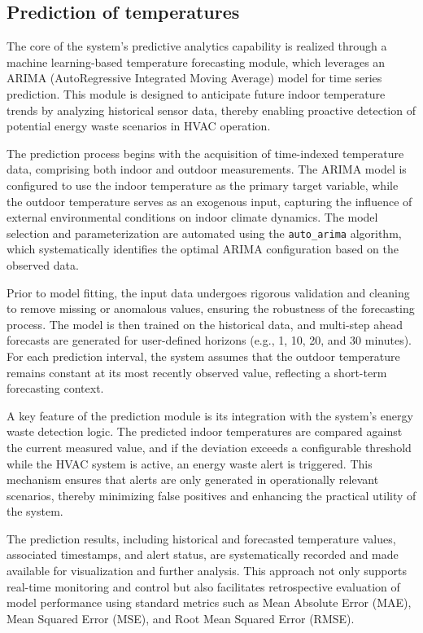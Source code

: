 \documentclass[journal]{IEEEtran}
\begin{document}
\subsection{Prediction of temperatures}
The core of the system's predictive analytics capability is realized through a machine learning-based temperature forecasting module, which leverages an ARIMA (AutoRegressive Integrated Moving Average) model for time series prediction. This module is designed to anticipate future indoor temperature trends by analyzing historical sensor data, thereby enabling proactive detection of potential energy waste scenarios in HVAC operation.

The prediction process begins with the acquisition of time-indexed temperature data, comprising both indoor and outdoor measurements. The ARIMA model is configured to use the indoor temperature as the primary target variable, while the outdoor temperature serves as an exogenous input, capturing the influence of external environmental conditions on indoor climate dynamics. The model selection and parameterization are automated using the \texttt{auto\_arima} algorithm, which systematically identifies the optimal ARIMA configuration based on the observed data.

Prior to model fitting, the input data undergoes rigorous validation and cleaning to remove missing or anomalous values, ensuring the robustness of the forecasting process. The model is then trained on the historical data, and multi-step ahead forecasts are generated for user-defined horizons (e.g., 1, 10, 20, and 30 minutes). For each prediction interval, the system assumes that the outdoor temperature remains constant at its most recently observed value, reflecting a short-term forecasting context.

A key feature of the prediction module is its integration with the system's energy waste detection logic. The predicted indoor temperatures are compared against the current measured value, and if the deviation exceeds a configurable threshold while the HVAC system is active, an energy waste alert is triggered. This mechanism ensures that alerts are only generated in operationally relevant scenarios, thereby minimizing false positives and enhancing the practical utility of the system.

The prediction results, including historical and forecasted temperature values, associated timestamps, and alert status, are systematically recorded and made available for visualization and further analysis. This approach not only supports real-time monitoring and control but also facilitates retrospective evaluation of model performance using standard metrics such as Mean Absolute Error (MAE), Mean Squared Error (MSE), and Root Mean Squared Error (RMSE).
\end{document}

